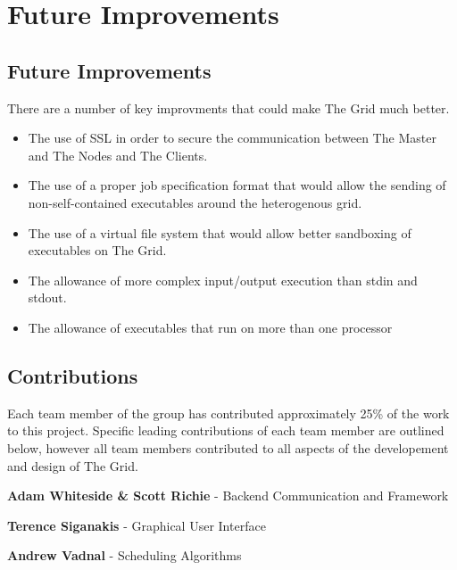\part{Future Improvements}
\label{futureimprovements}

\chapter{Future Improvements}
\label{futureimprovements}

There are a number of key improvments that could make The Grid much better.

\begin{itemize}
\item The use of SSL in order to secure the communication between The Master and The Nodes and The Clients.

\item The use of a proper job specification format that would allow the sending of non-self-contained executables around the heterogenous grid.

\item The use of a virtual file system that would allow better sandboxing of executables on The Grid.

\item The allowance of more complex input\slash output execution than stdin and stdout.

\item The allowance of executables that run on more than one processor

\end{itemize}

 \clearpage \chapter{Contributions}
\label{contributions}

Each team member of the group has contributed approximately 25\% of the work to this project. Specific leading contributions of each team member are outlined below, however all team members contributed to all aspects of the developement and design of The Grid. 

\textbf{Adam Whiteside \& Scott Richie} - Backend Communication and Framework

\textbf{Terence Siganakis} - Graphical User Interface

\textbf{Andrew Vadnal} - Scheduling Algorithms





